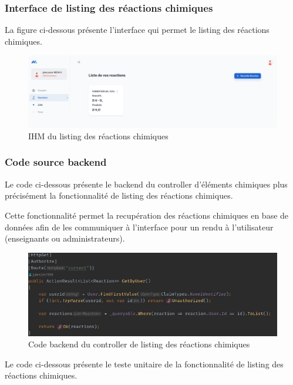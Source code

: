 \subsubsection{Interface de listing des réactions chimiques}

La figure ci-dessous présente l'interface qui permet le listing des réactions chimiques. 

\begin{figure}[H]
	\centering
	\includegraphics[width=1\textwidth]{img/ilrc}
	\caption{IHM du listing des réactions chimiques}
\end{figure}

\subsubsection{Code source backend}

Le code ci-dessous présente le backend du controller d'éléments chimiques plus précisément la fonctionnalité de listing des réactions chimiques.

Cette fonctionnalité permet la recupération des réactions chimiques en base de données afin de les communiquer à l'interface pour un rendu à l'utilisateur (enseignants ou administrateurs).

\begin{figure}[H]
	\centering
	\includegraphics[width=1\textwidth]{img/clrea}
	\caption{Code backend du controller de listing des réactions chimiques}
\end{figure}

Le code ci-dessous présente le teste unitaire de la fonctionnalité de listing des réactions chimiques.

